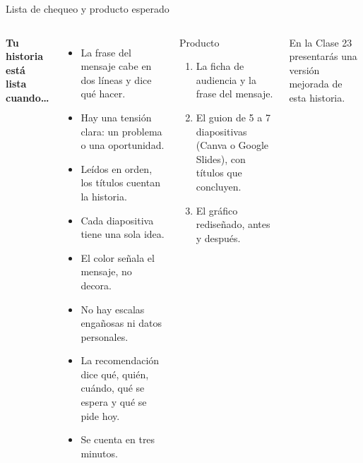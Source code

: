 \documentclass[aspectratio=169,11pt]{beamer}
\begin{document}
\begin{frame}[t]{Lista de chequeo y producto esperado}
  \begin{columns}[T,onlytextwidth]
    \small\textbf{Tu historia está lista cuando\ldots}
    \vspace{0.05cm}
    \begin{itemize}
      \footnotesize
      \item[$\square$] La frase del mensaje cabe en dos líneas y dice qué
        hacer.
      \item[$\square$] Hay una tensión clara: un problema o una
        oportunidad.
      \item[$\square$] Leídos en orden, los títulos cuentan la historia.
      \item[$\square$] Cada diapositiva tiene una sola idea.
      \item[$\square$] El color señala el mensaje, no decora.
      \item[$\square$] No hay escalas engañosas ni datos personales.
      \item[$\square$] La recomendación dice qué, quién, cuándo, qué se
        espera y qué se pide hoy.
      \item[$\square$] Se cuenta en tres minutos.
    \end{itemize}
    \begin{exampleblock}{Producto}
      \footnotesize
      \begin{enumerate}
        \footnotesize
        \item La ficha de audiencia y la frase del mensaje.
        \item El guion de 5 a 7 diapositivas (Canva o Google Slides),
          con títulos que concluyen.
        \item El gráfico rediseñado, antes y después.
      \end{enumerate}
    \end{exampleblock}
    \footnotesize En la Clase 23 presentarás una versión mejorada de esta
    historia.
  \end{columns}
\end{frame}

\end{document}
